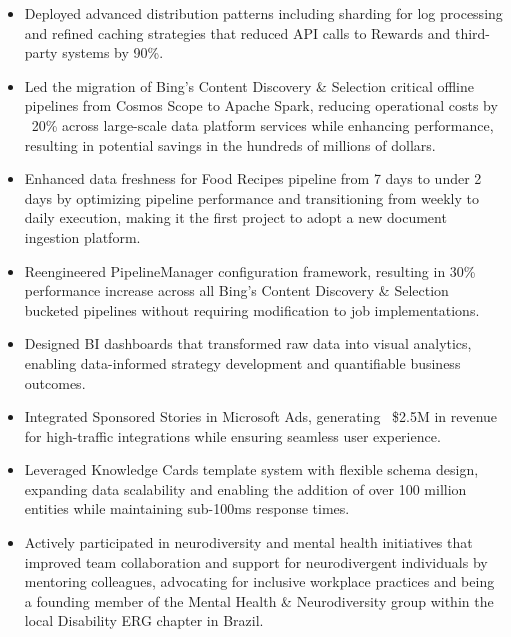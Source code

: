 \begin{itemize}
    \item \scriptsize{Deployed advanced distribution patterns including sharding for log processing and
        refined caching strategies that reduced API calls to Rewards and third-party systems by 90\%.}

    \item \scriptsize{Led the migration of Bing's Content Discovery \& Selection critical offline pipelines from
        Cosmos Scope to Apache Spark, reducing operational costs by ~20\% across large-scale data platform
        services while enhancing performance, resulting in potential savings in the hundreds of millions of
        dollars.}
    
    \item \scriptsize{Enhanced data freshness for Food Recipes pipeline from 7 days to under 2 days by optimizing
        pipeline performance and transitioning from weekly to daily execution, making it the first project to
        adopt a new document ingestion platform.}
    
    \item \scriptsize{Reengineered PipelineManager configuration framework, resulting in 30\% performance increase
        across all Bing's Content Discovery \& Selection bucketed pipelines without requiring modification to job
        implementations.}

    \item \scriptsize{Designed BI dashboards that transformed raw data into visual analytics, enabling data-informed strategy 
        development and quantifiable business outcomes.}

    \item \scriptsize{Integrated Sponsored Stories in Microsoft Ads, generating ~\$2.5M in revenue for high-traffic
        integrations while ensuring seamless user experience.}

    \item \scriptsize{Leveraged Knowledge Cards template system with flexible schema design, expanding data
        scalability and enabling the addition of over 100 million entities while maintaining sub-100ms response
        times.}

    \item \scriptsize{Actively participated in neurodiversity and mental health initiatives that improved team
        collaboration and support for neurodivergent individuals by mentoring colleagues, advocating for inclusive
        workplace practices and being a founding member of the Mental Health \& Neurodiversity group within the
        local Disability ERG chapter in Brazil.}
\end{itemize}